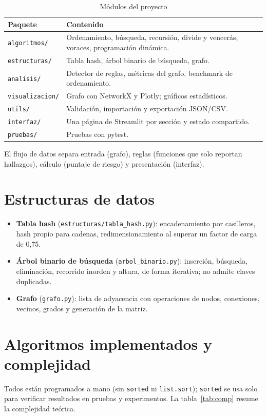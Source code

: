 \documentclass[12pt,a4paper]{article}
\begin{document}
\begin{table}[h]
\centering
\caption{Módulos del proyecto}\label{tab:arq}
\begin{tabular}{@{}p{4cm}p{10cm}@{}}
\toprule
\textbf{Paquete} & \textbf{Contenido}\\
\midrule
\texttt{algoritmos/} & Ordenamiento, búsqueda, recursión, divide y vencerás, voraces, programación dinámica.\\
\texttt{estructuras/} & Tabla hash, árbol binario de búsqueda, grafo.\\
\texttt{analisis/} & Detector de reglas, métricas del grafo, benchmark de ordenamiento.\\
\texttt{visualizacion/} & Grafo con NetworkX y Plotly; gráficos estadísticos.\\
\texttt{utils/} & Validación, importación y exportación JSON/CSV.\\
\texttt{interfaz/} & Una página de Streamlit por sección y estado compartido.\\
\texttt{pruebas/} & Pruebas con pytest.\\
\bottomrule
\end{tabular}
\end{table}

El flujo de datos separa entrada (grafo), reglas (funciones que solo reportan hallazgos), cálculo (puntaje de riesgo) y presentación (interfaz).

\section{Estructuras de datos}
\begin{itemize}
  \item \textbf{Tabla hash} (\texttt{estructuras/tabla\_hash.py}): encadenamiento por casilleros, hash propio para cadenas, redimensionamiento al superar un factor de carga de 0,75.
  \item \textbf{Árbol binario de búsqueda} (\texttt{arbol\_binario.py}): inserción, búsqueda, eliminación, recorrido inorden y altura, de forma iterativa; no admite claves duplicadas.
  \item \textbf{Grafo} (\texttt{grafo.py}): lista de adyacencia con operaciones de nodos, conexiones, vecinos, grados y generación de la matriz.
\end{itemize}

\section{Algoritmos implementados y complejidad}
Todos están programados a mano (sin \texttt{sorted} ni \texttt{list.sort}); \texttt{sorted} se usa solo para verificar resultados en pruebas y experimentos. La tabla~\ref{tab:comp} resume la complejidad teórica.
\end{document}
